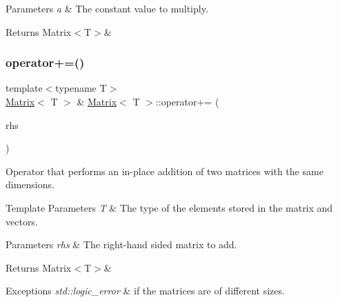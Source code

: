 \begin{DoxyParams}{Parameters}
{\em a} & The constant value to multiply. \\
\hline
\end{DoxyParams}
\begin{DoxyReturn}{Returns}
Matrix$<$\+T$>$\& 
\end{DoxyReturn}
\mbox{\label{classMatrix_a36fdb87d0aa1b906eda9fa1cf81a1477}} 
\subsubsection{\texorpdfstring{operator+=()}{operator+=()}\hspace{0.1cm}{\footnotesize\ttfamily [1/2]}}
{\footnotesize\ttfamily template$<$typename T$>$ \\
\mbox{\hyperlink{classMatrix}{Matrix}}$<$ T $>$ \& \mbox{\hyperlink{classMatrix}{Matrix}}$<$ T $>$\+::operator+= (\begin{DoxyParamCaption}\item[{const \mbox{\hyperlink{classMatrix}{Matrix}}$<$ T $>$ \&}]{rhs }\end{DoxyParamCaption})\hspace{0.3cm}{\ttfamily [inline]}}



Operator that performs an in-\/place addition of two matrices with the same dimensions. 


\begin{DoxyTemplParams}{Template Parameters}
{\em T} & The type of the elements stored in the matrix and vectors. \\
\hline
\end{DoxyTemplParams}

\begin{DoxyParams}{Parameters}
{\em rhs} & The right-\/hand sided matrix to add. \\
\hline
\end{DoxyParams}
\begin{DoxyReturn}{Returns}
Matrix$<$\+T$>$\&
\end{DoxyReturn}

\begin{DoxyExceptions}{Exceptions}
{\em std\+::logic\+\_\+error} & if the matrices are of different sizes. \\
\hline
\end{DoxyExceptions}
\mbox{\label{classMatrix_a5aeaf1a90547b2288646d57143d5518c}} 
